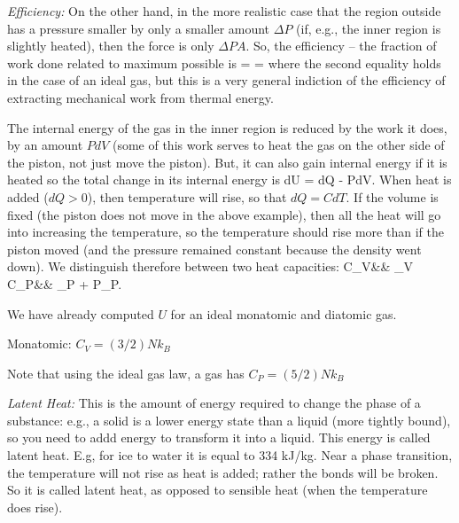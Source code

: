\documentclass[11pt]{book}
\begin{document}
\item {\it Efficiency:} 
On the other hand, in the more realistic case that the region outside has a pressure smaller by only a smaller amount $\Delta P$ (if, e.g., the inner region is slightly heated), then the force is only $\Delta P A$. So, the efficiency -- the fraction of work done related to maximum possible is
\be
\eta =  = 
\ee
where the second equality holds in the case of an ideal gas, but this is a very general indiction of the efficiency of extracting mechanical work from thermal energy.
%
\item 
The internal energy of the gas in the inner region is reduced by the work it does, by an amount $PdV$ (some of this work serves to heat the gas on the other side of the piston, not just move the piston). But, it can also gain internal energy if it is heated so the total change in its internal energy is
\be
dU = dQ - PdV.\ee
When heat is added ($dQ>0$), then temperature will rise, so that $dQ=CdT$. If the volume is fixed (the piston does not move in the above example), then all the heat will go into increasing the temperature, so the temperature should rise more than if the piston moved (and the pressure remained constant because the density went down). We distinguish therefore between two heat capacities:
\bea
C_V&\equiv& \Big\vert_V
\vs
C_P&\equiv& \Big\vert_P + P\Big\vert_P.
\eea
\item
We have already computed $U$ for an ideal monatomic and diatomic gas. 
\bei
\item Monatomic: $C_V = (3/2) Nk_B$
\item Note that using the ideal gas law, a gas has $C_P=(5/2)Nk_B$
\eei
\item {\it Latent Heat:} This is the amount of energy required to change the phase of a substance: e.g., a solid is a lower energy state than a liquid (more tightly bound), so you need to addd energy to transform it into a liquid. This energy is called latent heat. E.g, for ice to water it is equal to 334 kJ/kg. %
Near a phase transition, the temperature will not rise as heat is added; rather the bonds will be broken. So it is called latent heat, as opposed to sensible heat (when the temperature does rise).
\eee
 
\end{document}
